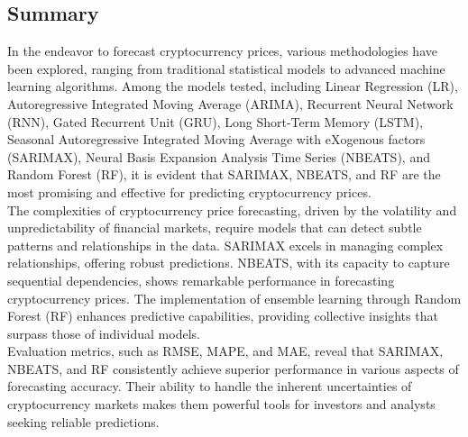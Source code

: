 \documentclass{ieeeojies}
\begin{document}
\subsection{Summary}
In the endeavor to forecast cryptocurrency prices, various methodologies have been explored, ranging from traditional statistical models to advanced machine learning algorithms. Among the models tested, including Linear Regression (LR), Autoregressive Integrated Moving Average (ARIMA), Recurrent Neural Network (RNN), Gated Recurrent Unit (GRU), Long Short-Term Memory (LSTM), Seasonal Autoregressive Integrated Moving Average with eXogenous factors (SARIMAX), Neural Basis Expansion Analysis Time Series (NBEATS), and Random Forest (RF), it is evident that SARIMAX, NBEATS, and RF are the most promising and effective for predicting cryptocurrency prices.\\
The complexities of cryptocurrency price forecasting, driven by the volatility and unpredictability of financial markets, require models that can detect subtle patterns and relationships in the data. SARIMAX excels in managing complex relationships, offering robust predictions. NBEATS, with its capacity to capture sequential dependencies, shows remarkable performance in forecasting cryptocurrency prices. The implementation of ensemble learning through Random Forest (RF) enhances predictive capabilities, providing collective insights that surpass those of individual models.\\
Evaluation metrics, such as RMSE, MAPE, and MAE, reveal that SARIMAX, NBEATS, and RF consistently achieve superior performance in various aspects of forecasting accuracy. Their ability to handle the inherent uncertainties of cryptocurrency markets makes them powerful tools for investors and analysts seeking reliable predictions.
\end{document}
